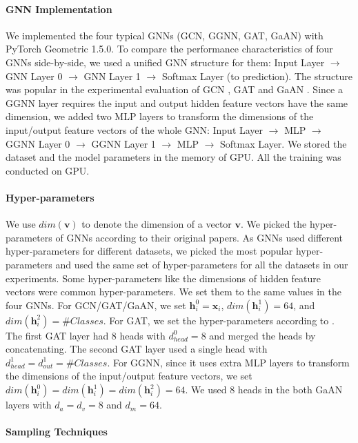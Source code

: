 \paragraph{GNN Implementation}
We implemented the four typical GNNs (GCN, GGNN, GAT, GaAN) with PyTorch Geometric 1.5.0.
To compare the performance characteristics of four GNNs side-by-side, we used a unified GNN structure for them: Input Layer $\rightarrow$ GNN Layer 0 $\rightarrow$ GNN Layer 1 $\rightarrow$ Softmax Layer (to prediction).
The structure was popular in the experimental evaluation of GCN \cite{kipf2017_gcn}, GAT \cite{huang2018_gat} and GaAN \cite{zhang2018_gaan}.
Since a GGNN layer requires the input and output hidden feature vectors have the same dimension, we added two MLP layers to transform the dimensions of the input/output feature vectors of the whole GNN: Input Layer $\rightarrow$ MLP $\rightarrow$ GGNN Layer 0 $\rightarrow$ GGNN Layer 1 $\rightarrow$ MLP $\rightarrow$ Softmax Layer.
We stored the dataset and the model parameters in the memory of GPU.
All the training was conducted on GPU.

\paragraph{Hyper-parameters}
We use $dim(\boldsymbol{v})$ to denote the dimension of a vector $\boldsymbol{v}$.
We picked the hyper-parameters of GNNs according to their original papers.
As GNNs used different hyper-parameters for different datasets, we picked the most popular hyper-parameters and used the same set of hyper-parameters for all the datasets in our experiments.
Some hyper-parameters like the dimensions of hidden feature vectors were common hyper-parameters.
We set them to the same values in the four GNNs.
For GCN/GAT/GaAN, we set $\boldsymbol{h}^0_i = \boldsymbol{x}_i$, $dim(\boldsymbol{h}^1_i)=64$, and $dim(\boldsymbol{h}^2_i)=\#Classes$.
For GAT, we set the hyper-parameters according to \cite{huang2018_gat}.
The first GAT layer had 8 heads with $d^0_{head}=8$ and merged the heads by concatenating.
The second GAT layer used a single head with $d^1_{head}=d^1_{out}=\#Classes$.
For GGNN, since it uses extra MLP layers to transform the dimensions of the input/output feature vectors, we set $dim(\boldsymbol{h}^0_i) = dim(\boldsymbol{h}^1_i) = dim(\boldsymbol{h}^2_i) = 64$.
We used 8 heads in the both GaAN layers with $d_a=d_v=8$ and $d_m=64$.

\paragraph{Sampling Techniques}

